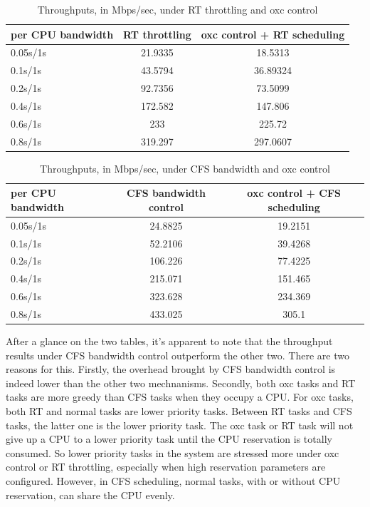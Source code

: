 \begin{table}[H]%
	\centering
	\begin{tabular}{|l||c|c|}\hline
		 per CPU bandwidth & RT throttling & oxc control + RT scheduling\\\hline
			0.05s/1s &	21.9335	&	18.5313	\\\hline 
			0.1s/1s &	43.5794 &	36.89324 \\\hline
			0.2s/1s &	92.7356 &	73.5099	\\\hline
			0.4s/1s &	172.582 &	147.806 \\\hline
			0.6s/1s &	233	&	225.72	\\\hline
			0.8s/1s &	319.297 &	297.0607	\\\hline
	\end{tabular}
	\caption{Throughputs, in Mbps/sec, under RT throttling and oxc control}
	\label{tab:expB1}
\end{table}
\begin{table}[H]%
	\centering
	\begin{tabular}{|l||c|c|}\hline
		 per CPU bandwidth & CFS bandwidth control & oxc control + CFS scheduling  \\\hline
		 0.05s/1s	& 24.8825	& 19.2151 \\\hline
		 0.1s/1s	& 52.2106	& 39.4268 \\\hline
		 0.2s/1s	& 106.226	& 77.4225 \\\hline
		 0.4s/1s	& 215.071	& 151.465 \\\hline
		 0.6s/1s	& 323.628	& 234.369 \\\hline
		 0.8s/1s	& 433.025	& 305.1 \\\hline
	\end{tabular}
	\caption{Throughputs, in Mbps/sec, under CFS bandwidth and oxc control}
	\label{tab:expB2}
\end{table}

After a glance on the two tables, it's apparent to note that the 
throughput results under CFS bandwidth control outperform the other two. 
There are two reasons for this. Firstly, the overhead brought by CFS 
bandwidth control is indeed lower than the other two mechnanisms.
Secondly, both oxc tasks and RT tasks are more greedy than CFS tasks when 
they occupy a CPU. For oxc tasks, both RT and normal tasks are lower
priority tasks. Between RT tasks and CFS tasks, the latter one is the 
lower priority task. The oxc task or RT task will not give up a CPU to 
a lower priority task until the CPU reservation is totally consumed. So 
lower priority tasks in the system are stressed more under oxc control 
or RT throttling, especially when high reservation parameters are configured. 
However, in CFS scheduling, normal tasks, with or without CPU reservation, 
can share the CPU evenly.

